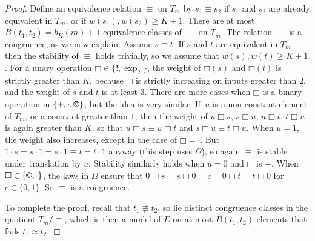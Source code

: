 \documentclass[10pt,a4paper]{amsart}
\newcommand{\bbox}{\mathbin{\Box}}
\newcommand{\cc}{\mathbin{\textup{\copyright}}}
\begin{document}
\begin{proof}
 
Define an equivalence relation $\equiv$ on $T_m$ by $s_1\equiv s_2$ if $s_1$ and $s_2$ are already equivalent in $T_m$, or if $w(s_1), w(s_2)\geq K+1$.  
There are at most $B(t_1,t_2)=b_K(m)+1$ equivalence classes of $\equiv$ on $T_m$.   
The relation $\equiv$ is a congruence, as we now explain.  Assume $s\equiv t$.  If $s$ and $t$ are equivalent in $T_m$ then the stability of $\equiv$ holds trivially, so we assume that $w(s), w(t)\geq K+1$.  
For a unary operation $\bbox\in \{!,\exp_2\}$, the weight of $\bbox(s)$ and $\bbox(t)$ is strictly greater than $K$, because $\bbox$ is strictly increasing on inputs greater than $2$, and the weight of $s$ and $t$ is at least $3$.  
There are more cases when $\bbox$ is a binary operation in $\{+,\cdot,\cc\}$, but the idea is very similar.  
If~$u$ is a non-constant element of $T_m$, or a constant greater than $1$, then the weight of  $u\bbox s$, $s\bbox u$, $u\bbox t$, $t\bbox u$ is again greater than $K$, so that $u\bbox s\equiv u\bbox t$ and $s\bbox u\equiv t\bbox u$. 
When $u=1$, the weight also increases, except in the case of $\bbox=\cdot$.  
But $1\cdot s=s\cdot 1=s\cdot 1\equiv t=t\cdot 1$ anyway (this step uses $\Omega$), so again $\equiv$ is stable under translation by $u$.  
Stability similarly holds when $u=0$ and $\bbox$ is $+$.  
When $\bbox\in \{\cc,\cdot\}$, the laws in $\Omega$ ensure that $0\bbox s=s\bbox 0=c=0\bbox t=t\bbox 0$ for $c\in \{0,1\}$.  
So $\equiv$ is a congruence.  

To complete the proof, recall that $t_1\not\equiv t_2$, so lie distinct congruence classes in the quotient $T_m/{\equiv}$, which is then a  model of $E$ on at most $B(t_1,t_2)$-elements that fails $t_1\approx t_2$.  
\end{proof}
\end{document}
